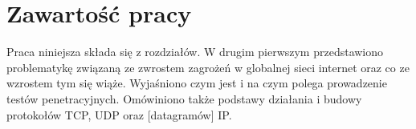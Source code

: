 \section{Zawartość pracy}
\label{sec:zawartoscPracy}


Praca niniejsza składa się z  rozdziałów. W drugim pierwszym przedstawiono problematykę związaną ze zwrostem zagrożeń w globalnej sieci internet oraz co ze wzrostem tym się wiąże. Wyjaśniono czym jest i na czym polega prowadzenie testów penetracyjnych. Omówiniono także podstawy działania i budowy protokołów TCP, UDP oraz [datagramów] IP. 


